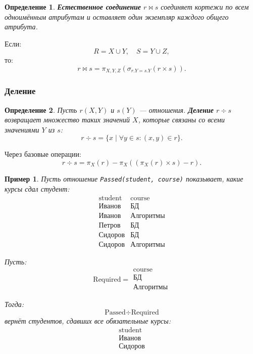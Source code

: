 \documentclass[12pt,a4paper]{article}
\newtheorem{definition}{Определение}[section]
\newtheorem{example}{Пример}[section]
\theoremstyle{remark}
\begin{document}
\begin{definition}
\textbf{Естественное соединение} $r \bowtie s$ соединяет кортежи по всем одноимённым атрибутам и оставляет один экземпляр каждого общего атрибута.
\end{definition}

Если:
\[
R = X \cup Y,\quad S = Y \cup Z,
\]
то:
\[
r \bowtie s =
\pi_{X,Y,Z}
\left(
\sigma_{r.Y = s.Y}(r \times s)
\right).
\]

\subsubsection{Деление}

\begin{definition}
Пусть $r(X,Y)$ и $s(Y)$ --- отношения. \textbf{Деление} $r \div s$ возвращает множество таких значений $X$, которые связаны со всеми значениями $Y$ из $s$:
\[
r \div s =
\{x \mid \forall y \in s: (x,y) \in r\}.
\]
\end{definition}

Через базовые операции:
\[
r \div s =
\pi_X(r) -
\pi_X \left(
(\pi_X(r) \times s) - r
\right).
\]

\begin{example}
Пусть отношение \texttt{Passed(student, course)} показывает, какие курсы сдал студент:
\[
\begin{array}{c|c}
\text{student} & \text{course} \\
\hline
\text{Иванов} & \text{БД} \\
\text{Иванов} & \text{Алгоритмы} \\
\text{Петров} & \text{БД} \\
\text{Сидоров} & \text{БД} \\
\text{Сидоров} & \text{Алгоритмы}
\end{array}
\]

Пусть:
\[
\text{Required} =
\begin{array}{c}
\text{course} \\
\hline
\text{БД} \\
\text{Алгоритмы}
\end{array}
\]

Тогда:
\[
\text{Passed} \div \text{Required}
\]
вернёт студентов, сдавших все обязательные курсы:
\[
\begin{array}{c}
\text{student} \\
\hline
\text{Иванов} \\
\text{Сидоров}
\end{array}
\]
\end{example}
\end{document}
